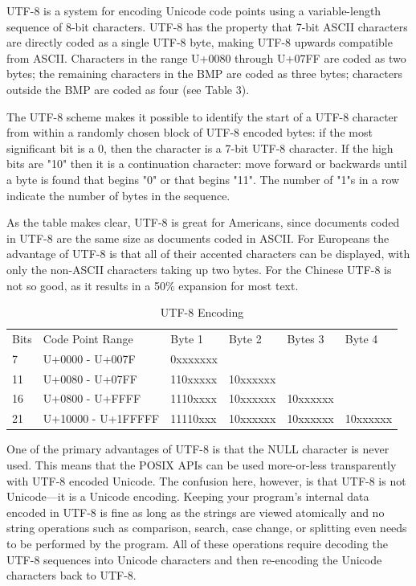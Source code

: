 UTF-8 is a system for encoding Unicode code points using a
variable-length sequence of 8-bit characters. UTF-8 has the property
that 7-bit ASCII characters are directly coded as a single UTF-8 byte,
making UTF-8 upwards compatible from ASCII. Characters in the range
U+0080 through U+07FF are coded as two bytes; the remaining characters
in the BMP are coded as three bytes; characters outside the BMP are
coded as four (see Table 3). 

The UTF-8 scheme makes it possible to identify the start of a UTF-8 character from within a randomly chosen block of UTF-8 encoded bytes: if the most significant bit is a 0, then the character is a 7-bit UTF-8 character. If the high bits are "10" then it is a continuation character: move forward or backwards until a byte is found that begins "0" or that begins "11". The number of "1"s in a row indicate the number of bytes in the sequence.

As the table makes clear, UTF-8 is great for Americans, since documents coded in UTF-8 are the same size as documents coded in ASCII. For Europeans the advantage of UTF-8 is that all of their accented characters can be displayed, with only the non-ASCII characters taking up two bytes. For the Chinese UTF-8 is not so good, as it results in a 50\% expansion for most text.


\begin{table}
\begin{tabular}{llllll}
    Bits &Code Point Range  &  Byte 1 &    Byte 2&    Bytes 3&    Byte 4\\
    7    &U+0000  - U+007F  & 0xxxxxxx&\\
    11   &U+0080  - U+07FF  & 110xxxxx&   10xxxxxx&\\
    16   &U+0800  - U+FFFF  & 1110xxxx&   10xxxxxx&  10xxxxxx&\\
    21   &U+10000 - U+1FFFFF& 11110xxx&   10xxxxxx&  10xxxxxx&  10xxxxxx\\
\end{tabular}
\caption{UTF-8 Encoding}
\end{table}

One of the primary advantages of UTF-8 is that the NULL character is never used. This means that the POSIX APIs can be used more-or-less transparently with UTF-8 encoded Unicode. The confusion here, however, is that UTF-8 is not Unicode---it is a Unicode encoding. Keeping your program's internal data encoded in UTF-8 is fine as long as the strings are viewed atomically and no string operations such as comparison, search, case change, or splitting even needs to be performed by the program. All of these operations require decoding the UTF-8 sequences into Unicode characters and then re-encoding the Unicode characters back to UTF-8.




